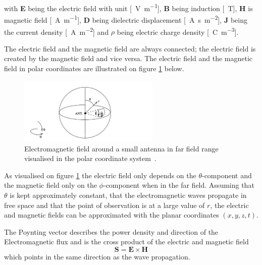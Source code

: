 with \textbf{E} being the electric field with unit [\SI{}{\volt\per\meter}], \textbf{B} being induction [\SI{}{\tesla}], \textbf{H} is magnetic field [\SI{}{\ampere\per\meter}], \textbf{D} being dielectric displacement [\SI{}{\ampere\second\per\meter\squared}], \textbf{J} being the current density [\SI{}{\ampere\per\meter\squared}] and $\rho$ being electric charge density [\SI{}{\coulomb\per\meter\cubed}].

The electric field and the magnetic field are always connected; the electric field is created by the magnetic field and vice versa. The electric field and the magnetic field in polar coordinates are illustrated on figure \ref{fig:em_field} below.
\begin{figure}[h]
    \centering
    \includegraphics[width=0.6\textwidth]{figures/em_polar_coordinates.png}
    \caption{Electromagnetic field around a small antenna in far field range visualised in the polar coordinate system~\cite[p. 58]{maxwell_theory}.} \label{fig:em_field}
\end{figure}

As visualised on figure \ref{fig:em_field} the electric field only depends on the $\theta$-component and the magnetic field only on the $\phi$-component when in the far field. Assuming that $\theta$ is kept approximately constant, that the electromagnetic waves propagate in free space and that the point of observation is at a large value of $r$, the electric and magnetic fields can be approximated with the planar coordinates $\left( x, y, z, t \right)$.

The Poynting vector describes the power density and direction of the Electromagnetic flux and is the cross product of the electric and magnetic field 
\begin{equation}
    \textbf{S} = \textbf{E} \times \textbf{H}
\end{equation}
which points in the same direction as the wave propagation. 

